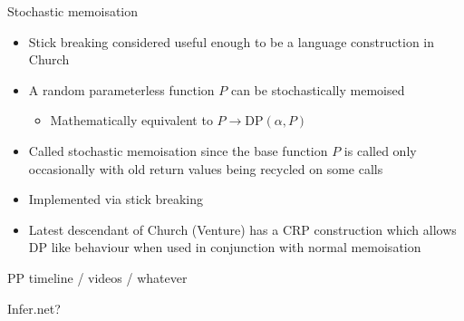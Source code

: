 \begin{frame}{Stochastic memoisation}
  \begin{itemize}
    \item Stick breaking considered useful enough to be a language construction  in Church
    \vspace{\baselineskip}
    \item A random parameterless function $P$ can be stochastically memoised
    \begin{itemize}
      \item Mathematically equivalent to $P \to \textrm{DP}(\alpha, P)$
    \end{itemize}
    \vspace{\baselineskip}
    \item Called stochastic memoisation since the base function $P$ is called only occasionally with old return values being recycled on some calls
    \vspace{\baselineskip}
    \item Implemented via stick breaking 
    \vspace{\baselineskip}
    \item Latest descendant of Church (Venture) has a CRP construction which allows DP like behaviour when used in conjunction with normal memoisation
  \end{itemize}
\end{frame}

\begin{frame}{PP timeline / videos / whatever}

Infer.net?
\end{frame}




